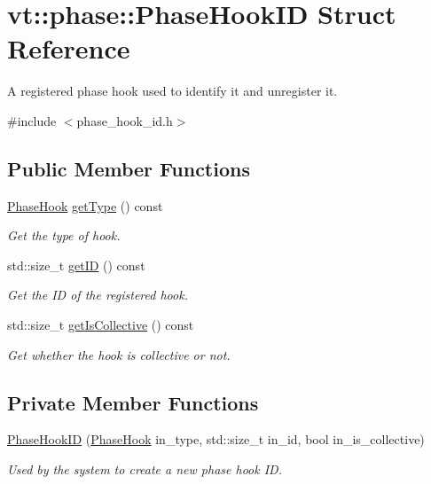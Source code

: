 \hypertarget{structvt_1_1phase_1_1_phase_hook_i_d}{}\section{vt\+:\+:phase\+:\+:Phase\+Hook\+ID Struct Reference}
\label{structvt_1_1phase_1_1_phase_hook_i_d}


A registered phase hook used to identify it and unregister it.  




{\ttfamily \#include $<$phase\+\_\+hook\+\_\+id.\+h$>$}

\subsection*{Public Member Functions}
\begin{DoxyCompactItemize}
\item 
\hyperlink{namespacevt_1_1phase_aec9a63fdd99680d7a7fe99d321193811}{Phase\+Hook} \hyperlink{structvt_1_1phase_1_1_phase_hook_i_d_a2174260d92495e701ce0636e62b25004}{get\+Type} () const
\begin{DoxyCompactList}\small\item\em Get the type of hook. \end{DoxyCompactList}\item 
std\+::size\+\_\+t \hyperlink{structvt_1_1phase_1_1_phase_hook_i_d_ad00ab1e7e2854b3463b39e96ab149a13}{get\+ID} () const
\begin{DoxyCompactList}\small\item\em Get the ID of the registered hook. \end{DoxyCompactList}\item 
std\+::size\+\_\+t \hyperlink{structvt_1_1phase_1_1_phase_hook_i_d_ad3f0edab6498385a2611f41f7a658ffa}{get\+Is\+Collective} () const
\begin{DoxyCompactList}\small\item\em Get whether the hook is collective or not. \end{DoxyCompactList}\end{DoxyCompactItemize}
\subsection*{Private Member Functions}
\begin{DoxyCompactItemize}
\item 
\hyperlink{structvt_1_1phase_1_1_phase_hook_i_d_a2e8a595296be3f2a49f59c5f0287d9e5}{Phase\+Hook\+ID} (\hyperlink{namespacevt_1_1phase_aec9a63fdd99680d7a7fe99d321193811}{Phase\+Hook} in\+\_\+type, std\+::size\+\_\+t in\+\_\+id, bool in\+\_\+is\+\_\+collective)
\begin{DoxyCompactList}\small\item\em Used by the system to create a new phase hook ID. \end{DoxyCompactList}\end{DoxyCompactItemize}
